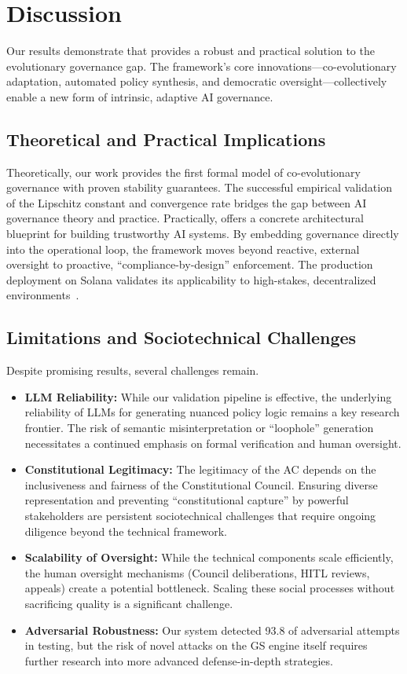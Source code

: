 \section{Discussion}
\label{sec:discussion}
Our results demonstrate that \acgs{} provides a robust and practical solution to the evolutionary governance gap. The framework's core innovations---co-evolutionary adaptation, automated policy synthesis, and democratic oversight---collectively enable a new form of intrinsic, adaptive AI governance.

\subsection{Theoretical and Practical Implications}
Theoretically, our work provides the first formal model of co-evolutionary governance with proven stability guarantees. The successful empirical validation of the Lipschitz constant and convergence rate bridges the gap between AI governance theory and practice. Practically, \acgs{} offers a concrete architectural blueprint for building trustworthy AI systems. By embedding governance directly into the operational loop, the framework moves beyond reactive, external oversight to proactive, ``compliance-by-design'' enforcement. The production deployment on Solana validates its applicability to high-stakes, decentralized environments~\cite{solana2020, quantumagi2024}.

\subsection{Limitations and Sociotechnical Challenges}
Despite promising results, several challenges remain.
\begin{itemize}[leftmargin=*,topsep=2pt,itemsep=2pt,parsep=0pt]
    \item \textbf{LLM Reliability:} While our validation pipeline is effective, the underlying reliability of LLMs for generating nuanced policy logic remains a key research frontier. The risk of semantic misinterpretation or ``loophole'' generation necessitates a continued emphasis on formal verification and human oversight.
    \item \textbf{Constitutional Legitimacy:} The legitimacy of the AC depends on the inclusiveness and fairness of the Constitutional Council. Ensuring diverse representation and preventing ``constitutional capture'' by powerful stakeholders are persistent sociotechnical challenges that require ongoing diligence beyond the technical framework.
    \item \textbf{Scalability of Oversight:} While the technical components scale efficiently, the human oversight mechanisms (Council deliberations, HITL reviews, appeals) create a potential bottleneck. Scaling these social processes without sacrificing quality is a significant challenge.
    \item \textbf{Adversarial Robustness:} Our system detected 93.8\percent{} of adversarial attempts in testing, but the risk of novel attacks on the GS engine itself requires further research into more advanced defense-in-depth strategies.
\end{itemize}

